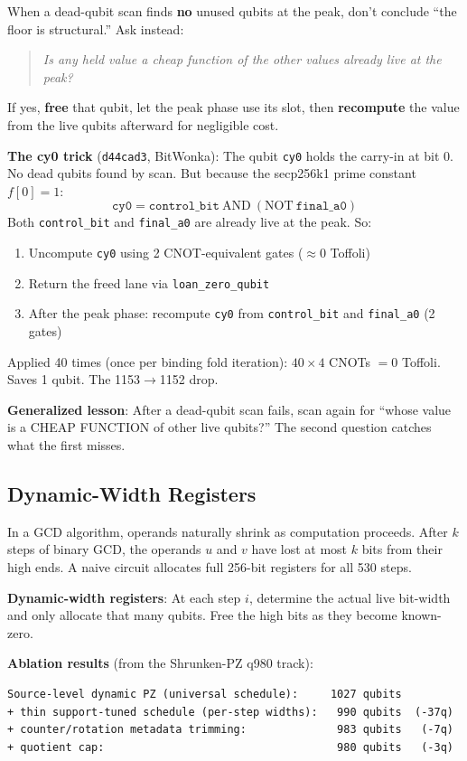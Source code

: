 \documentclass[11pt,a4paper]{article}
\begin{document}
When a dead-qubit scan finds \textbf{no} unused qubits at the peak, don't conclude
``the floor is structural.'' Ask instead:

\begin{quote}
  \textit{Is any held value a cheap function of the other values already live at the peak?}
\end{quote}

If yes, \textbf{free} that qubit, let the peak phase use its slot, then \textbf{recompute} the
value from the live qubits afterward for negligible cost.

\textbf{The cy0 trick} (\texttt{d44cad3}, BitWonka): The qubit \texttt{cy0} holds the carry-in
at bit 0. No dead qubits found by scan. But because the secp256k1 prime constant $f[0] = 1$:
\[
  \texttt{cy0} = \texttt{control\_bit}\ \text{AND}\ (\text{NOT}\ \texttt{final\_a0})
\]
Both \texttt{control\_bit} and \texttt{final\_a0} are already live at the peak. So:
\begin{enumerate}
  \item Uncompute \texttt{cy0} using 2 CNOT-equivalent gates ($\approx 0$ Toffoli)
  \item Return the freed lane via \texttt{loan\_zero\_qubit}
  \item After the peak phase: recompute \texttt{cy0} from \texttt{control\_bit} and
    \texttt{final\_a0} (2 gates)
\end{enumerate}
Applied 40 times (once per binding fold iteration): $40 \times 4$ CNOTs $= 0$ Toffoli.
Saves 1 qubit. The 1153$\to$1152 drop.

\textbf{Generalized lesson}: After a dead-qubit scan fails, scan again for ``whose value is a
CHEAP FUNCTION of other live qubits?'' The second question catches what the first misses.

\subsection{Dynamic-Width Registers}

In a GCD algorithm, operands naturally shrink as computation proceeds. After $k$ steps of binary
GCD, the operands $u$ and $v$ have lost at most $k$ bits from their high ends. A naive circuit
allocates full 256-bit registers for all 530 steps.

\textbf{Dynamic-width registers}: At each step $i$, determine the actual live bit-width and only
allocate that many qubits. Free the high bits as they become known-zero.

\textbf{Ablation results} (from the Shrunken-PZ q980 track):
\begin{lstlisting}
Source-level dynamic PZ (universal schedule):     1027 qubits
+ thin support-tuned schedule (per-step widths):   990 qubits  (-37q)
+ counter/rotation metadata trimming:              983 qubits   (-7q)
+ quotient cap:                                    980 qubits   (-3q)
\end{lstlisting}
\end{document}
